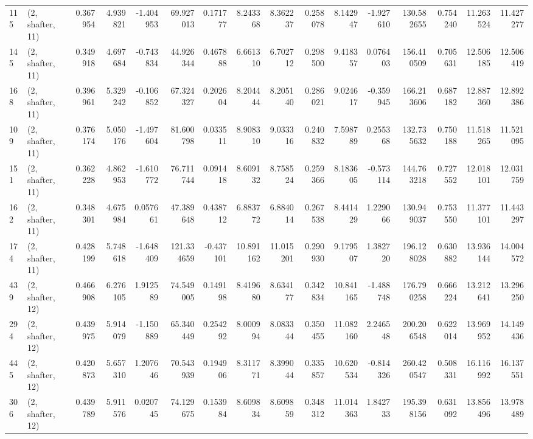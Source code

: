 \begin{tabular}{llrrrrrrrrrrrrrr}
115 &  (2, shafter, 11) &   0.367954 &   4.939821 &  -1.404953 &    69.927013 &   0.171777 &   8.243368 &   8.362237 &  0.258078 &   8.142947 &  -1.927610 &   130.582655 &   0.754240 &  11.263524 &  11.427277 \\
145 &  (2, shafter, 11) &   0.349918 &   4.697684 &  -0.743834 &    44.926344 &   0.467888 &   6.661310 &   6.702712 &  0.298500 &   9.418357 &   0.076403 &   156.410509 &   0.705631 &  12.506185 &  12.506419 \\
168 &  (2, shafter, 11) &   0.396961 &   5.329242 &  -0.106852 &    67.324327 &   0.202604 &   8.204444 &   8.205140 &  0.286021 &   9.024617 &  -0.359945 &   166.213606 &   0.687182 &  12.887360 &  12.892386 \\
109 &  (2, shafter, 11) &   0.376174 &   5.050176 &  -1.497604 &    81.600798 &   0.033511 &   8.908310 &   9.033316 &  0.240832 &   7.598789 &   0.255368 &   132.735632 &   0.750188 &  11.518265 &  11.521095 \\
151 &  (2, shafter, 11) &   0.362228 &   4.862953 &  -1.610772 &    76.711744 &   0.091418 &   8.609132 &   8.758524 &  0.259366 &   8.183605 &  -0.573114 &   144.763218 &   0.727552 &  12.018101 &  12.031759 \\
162 &  (2, shafter, 11) &   0.348301 &   4.675984 &   0.057661 &    47.389648 &   0.438712 &   6.883772 &   6.884014 &  0.267538 &   8.441429 &   1.229066 &   130.949037 &   0.753550 &  11.377101 &  11.443297 \\
174 &  (2, shafter, 11) &   0.428199 &   5.748618 &  -1.648409 &   121.334659 &  -0.437101 &  10.891162 &  11.015201 &  0.290930 &   9.179507 &   1.382720 &   196.128028 &   0.630882 &  13.936144 &  14.004572 \\
439 &  (2, shafter, 12) &   0.466908 &   6.276105 &   1.912589 &    74.549005 &   0.149198 &   8.419680 &   8.634177 &  0.342834 &  10.841165 &  -1.488748 &   176.790258 &   0.666224 &  13.212641 &  13.296250 \\
294 &  (2, shafter, 12) &   0.439975 &   5.914079 &  -1.150889 &    65.340449 &   0.254292 &   8.000994 &   8.083344 &  0.350455 &  11.082160 &   2.246548 &   200.206548 &   0.622014 &  13.969952 &  14.149436 \\
445 &  (2, shafter, 12) &   0.420873 &   5.657310 &   1.207646 &    70.543939 &   0.194906 &   8.311771 &   8.399044 &  0.335857 &  10.620534 &  -0.814326 &   260.420547 &   0.508331 &  16.116992 &  16.137551 \\
306 &  (2, shafter, 12) &   0.439789 &   5.911576 &   0.020745 &    74.129675 &   0.153984 &   8.609834 &   8.609859 &  0.348312 &  11.014363 &   1.842733 &   195.398156 &   0.631092 &  13.856496 &  13.978489 \\

\end{tabular}

